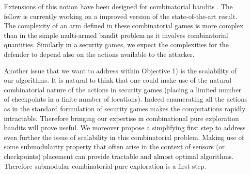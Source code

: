 %
%
%
Extensions of this notion have been designed for combinatorial bandits \cite{chen2014combinatorial}. The fellow is currently working on a improved version of the state-of-the-art result. The complexity of an arm defined in these combinatorial games is  more complex than in the simple multi-armed bandit problem as it involves combinatorial quantities. Similarly in a security games, we expect the complexities for the defender to depend also on the actions available to the attacker.

Another issue that we want to address within Objective 1) is the scalability of our algorithms. It is natural to think that one could make use of the natural combinatorial nature of the actions in security games (placing a limited number of checkpoints in a finite number of locations). Indeed enumerating all the actions as in the standard formulation of security games makes the computations rapidly intractable. Therefore bringing our expertise in combinational pure exploration bandits will prove useful. We moreover propose a simplifying first step to address even further the issue of scalability in  this combinatorial problem. Making use of some submodularity property that often arise in the context of sensors (or checkpoints) placement can provide tractable and almost optimal algorithms. Therefore submodular combinatorial pure exploration is a first step.




